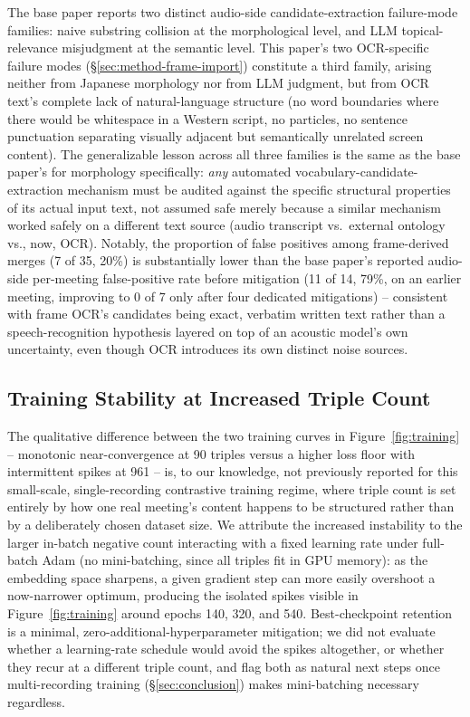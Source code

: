 ﻿\documentclass[twocolumn]{article}
\begin{document}
The base paper reports two distinct audio-side candidate-extraction failure-mode families: naive
substring collision at the morphological level, and LLM topical-relevance misjudgment at the
semantic level. This paper's two OCR-specific failure modes
(\S\ref{sec:method-frame-import}) constitute a third family, arising neither from Japanese
morphology nor from LLM judgment, but from OCR text's complete lack of natural-language structure
(no word boundaries where there would be whitespace in a Western script, no particles, no sentence
punctuation separating visually adjacent but semantically unrelated screen content). The
generalizable lesson across all three families is the same as the base paper's for morphology
specifically: \emph{any} automated vocabulary-candidate-extraction mechanism must be audited against
the specific structural properties of its actual input text, not assumed safe merely because a
similar mechanism worked safely on a different text source (audio transcript vs.\ external ontology
vs., now, OCR). Notably, the proportion of false positives among frame-derived merges (7 of 35, 20\%)
is substantially lower than the base paper's reported audio-side per-meeting false-positive rate
before mitigation (11 of 14, 79\%, on an earlier meeting, improving to 0 of 7 only after four
dedicated mitigations) -- consistent with frame OCR's candidates being exact, verbatim written text
rather than a speech-recognition hypothesis layered on top of an acoustic model's own uncertainty,
even though OCR introduces its own distinct noise sources.

\subsection{Training Stability at Increased Triple Count}
\label{sec:discuss-training}

The qualitative difference between the two training curves in Figure~\ref{fig:training} --
monotonic near-convergence at 90 triples versus a higher loss floor with intermittent spikes at 961
-- is, to our knowledge, not previously reported for this small-scale, single-recording contrastive
training regime, where triple count is set entirely by how one real meeting's content happens to be
structured rather than by a deliberately chosen dataset size. We attribute the increased instability
to the larger in-batch negative count interacting with a fixed learning rate under full-batch Adam
(no mini-batching, since all triples fit in GPU memory): as the embedding space sharpens, a given
gradient step can more easily overshoot a now-narrower optimum, producing the isolated spikes
visible in Figure~\ref{fig:training} around epochs 140, 320, and 540. Best-checkpoint retention is a
minimal, zero-additional-hyperparameter mitigation; we did not evaluate whether a learning-rate
schedule would avoid the spikes altogether, or whether they recur at a different triple count,
and flag both as natural next steps once multi-recording training (\S\ref{sec:conclusion}) makes
mini-batching necessary regardless.
\end{document}

